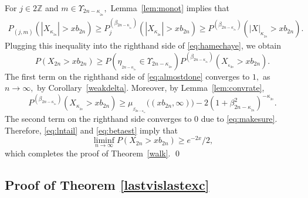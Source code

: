 \documentclass[12pt]{amsart}
\begin{document}
For $j\in 2{{\mathbb Z}}$ and $m\in \Upsilon_{2n-\kappa_{_{2n}}},$
Lemma~\ref{lem:monot} implies that \begin{eqnarray}
\label{comp2}
P_{(j,m)}(|X_{\kappa_{_{2n}}} |
> xb_{2n}) \geq
P^{(\beta_{2n-\kappa_{_{2n}}})}_j(|X_{\kappa_{_{2n}}}|> xb_{2n}
)\geq P^{(\beta_{2n-\kappa_{_{2n}}})}(|X|_{\kappa_{_{2n}}}>
xb_{2n}).\end{eqnarray} Plugging this inequality into the righthand side of
\eqref{eq:hamechaye}, we obtain
\begin{equation}
\label{eq:almostdone} P(X_{2n} >xb_{2n})  \ge
P(\eta_{_{2n-\kappa_{_{2n}}}}\in \Upsilon_{2n-\kappa_{_{2n}}})
P^{(\beta_{2n-\kappa_{_{2n}}})}(X_{_{\kappa_{2n}}}> xb_{2n}).
\end{equation}
The first term on the righthand side of \eqref{eq:almostdone} converges to $1,$ as
$n\to\infty,$ by Corollary~\ref{weakdelta}. Moreover, by Lemma~\ref{lem:convrate},
$$ P^{(\beta_{2n-\kappa_{_{2n}}})}(X_{\kappa_{_{2n}}}> xb_{2n} )
\ge \mu_{_{\beta_{2n-\kappa_{_{2n}}}}}\bigl((xb_{2n},\infty)\bigr) -
2(1+\beta_{2n-\kappa_{_{2n}}}^2)^{-\kappa_{_{2n}}}.$$
The second term on the righthand side converges to $0$ due to \eqref{eq:makesure}. Therefore,
\eqref{eq:lntail} and \eqref{eq:betaest} imply that
$$\liminf_{n\to\infty} P(X_{2n} > xb_{2n}) \geq e^{-2x}/2,$$
which completes the proof of Theorem~\ref{walk}. \qed
\subsection{Proof of Theorem \ref{lastvislastexc}}
\label{last}
\end{document}
